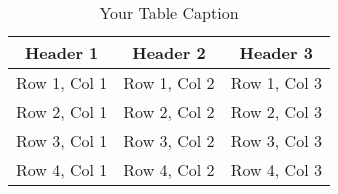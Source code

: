 \begin{table}[h]
\centering
\caption{Your Table Caption}
\begin{tabular}{|c|c|c|}
\hline
Header 1 & Header 2 & Header 3 \\
\hline
Row 1, Col 1 & Row 1, Col 2 & Row 1, Col 3 \\
\hline
Row 2, Col 1 & Row 2, Col 2 & Row 2, Col 3 \\
\hline
Row 3, Col 1 & Row 3, Col 2 & Row 3, Col 3 \\
\hline
Row 4, Col 1 & Row 4, Col 2 & Row 4, Col 3 \\
\hline
\end{tabular}
\label{tab:my_label}
\end{table}
